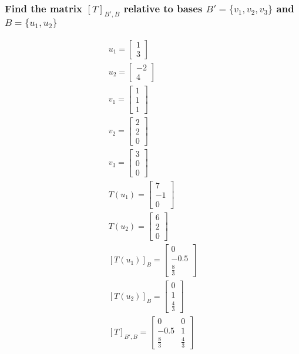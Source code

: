 \documentclass[12pt, a4paper]{article}
\begin{document}
			\subsubsection{Find the matrix $[T]_{B',B}$ relative to bases $B'=\{v_1,v_2,v_3\}$ and $B=\{u_1,u_2\}$}
				\begin{align*}
					u_1=\begin{bmatrix}1\\3\end{bmatrix}\\
					u_2=\begin{bmatrix}-2\\4\end{bmatrix}\\
					v_1=\begin{bmatrix}1\\1\\1\end{bmatrix}\\
					v_2=\begin{bmatrix}2\\2\\0\end{bmatrix}\\
					v_3=\begin{bmatrix}3\\0\\0\end{bmatrix}\\
					T(u_1)=\begin{bmatrix}7\\-1\\0\end{bmatrix}\\
					T(u_2)=\begin{bmatrix}6\\2\\0\end{bmatrix}\\
					[T(u_1)]_B=\begin{bmatrix}0\\-0.5\\\frac{8}{3}\end{bmatrix}\\
					[T(u_2)]_B=\begin{bmatrix}0\\1\\\frac{4}{3}\end{bmatrix}\\
					[T]_{B',B}=\begin{bmatrix}0&0\\-0.5&1\\\frac{8}{3}&\frac{4}{3}\end{bmatrix}
				\end{align*}
\end{document}
